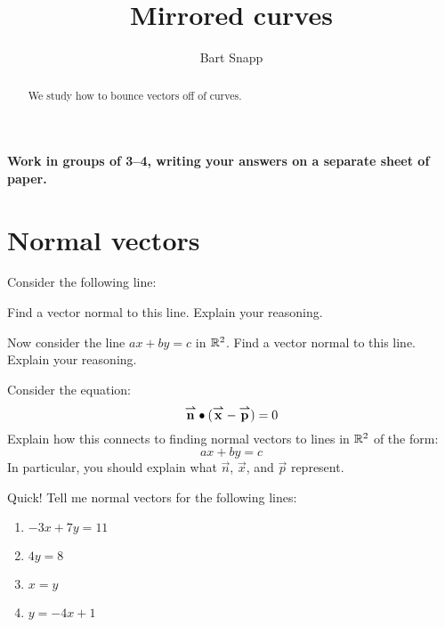 \documentclass[handout,noauthor,nooutcomes]{ximera}
\author{Bart Snapp}
\title[Collaborate:]{Mirrored curves}
\begin{document}
\begin{abstract}
  We study how to bounce vectors off of curves.
\end{abstract}
\maketitle

\textbf{Work in groups of 3--4, writing your answers on a separate
  sheet of paper.}

\section{Normal vectors}

\begin{problem}
Consider the following line:
\begin{image}
\end{image}
Find a vector normal to this line. Explain your reasoning.
\end{problem}

\begin{problem}
  Now consider the line $ax+by = c$ in $\mathbb R^2$. Find a vector normal to
  this line. Explain your reasoning.
\end{problem}

\begin{problem}
  Consider the equation:
  \[
  {\overset{\boldsymbol{\rightharpoonup}}{\mathbf{n}}}\bullet ({\overset{\boldsymbol{\rightharpoonup}}{\mathbf{x}}}-{\overset{\boldsymbol{\rightharpoonup}}{\mathbf{p}}}) = 0
  \]
  Explain how this connects to finding normal vectors to lines in
  $\mathbb R^2$ of the form:
  \[
  ax + by = c
  \]
  In particular, you should explain what $\vec{n}$, $\vec{x}$, and
  $\vec{p}$ represent.
\end{problem}


\begin{problem}
  Quick! Tell me normal vectors for the following lines:
  \begin{multicols}{2}
  \begin{enumerate}
  \item $-3x+7y=11$
  \item $4y =8$
  \item $x=y$
  \item $y=-4x+1$
  \end{enumerate}
  \end{multicols}
\end{problem}
\end{document}
